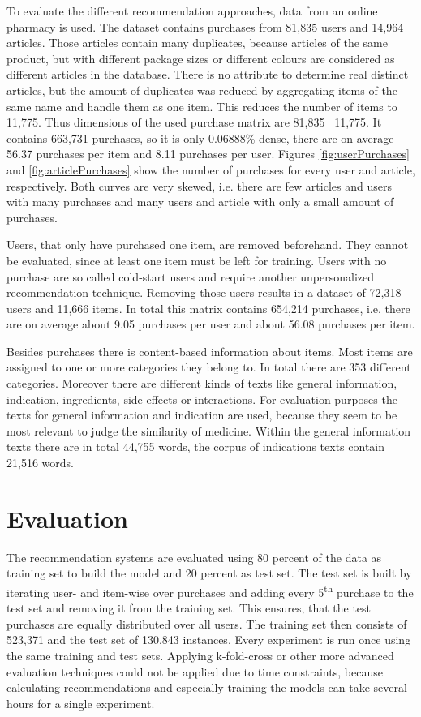 \documentclass[10pt]{reportMaster}
\begin{document}
To evaluate the different recommendation approaches, data from an online pharmacy is used.
The dataset contains purchases from 81,835 users and 14,964 articles.
Those articles contain many duplicates, because articles of the same product, but with different package sizes or different colours are considered as different articles in the database.
There is no attribute to determine real distinct articles, but the amount of duplicates was reduced by aggregating items of the same name and handle them as one item.
This reduces the number of items to 11,775.
Thus dimensions of the used purchase matrix are 81,835 \texttimes \ 11,775.
It contains 663,731 purchases, so it is only 0.06888\% dense, there are on average 56.37 purchases per item and 8.11 purchases per user. %
Figures \ref{fig:userPurchases} and \ref{fig:articlePurchases} show the number of purchases for every user and article, respectively.
Both curves are very skewed, i.e. there are few articles and users with many purchases and many users and article with only a small amount of purchases.

Users, that only have purchased one item, are removed beforehand.
They cannot be evaluated, since at least one item must be left for training.
Users with no purchase are so called cold-start users and require another unpersonalized recommendation technique.
Removing those users results in a dataset of 72,318 users and 11,666 items.
In total this matrix contains 654,214 purchases, i.e. there are on average about 9.05 purchases per user and about 56.08 purchases per item.

Besides purchases there is content-based information about items.
Most items are assigned to one or more categories they belong to.
In total there are 353 different categories.
Moreover there are different kinds of texts like general information, indication, ingredients, side effects or interactions.
For evaluation purposes the texts for general information and indication are used, because they seem to be most relevant to judge the similarity of medicine.
Within the general information texts there are in total 44,755 words, the corpus of indications texts contain 21,516 words.


 \section{Evaluation}
\label{sec:eval}
The recommendation systems are evaluated using 80 percent of the data as training set to build the model and 20 percent as test set.
The test set is built by iterating user- and item-wise over purchases and adding every 5\textsuperscript{th} purchase to the test set and removing it from the training set.
This ensures, that the test purchases are equally distributed over all users.
The training set then consists of 523,371 and the test set of 130,843 instances.
Every experiment is run once using the same training and test sets.
Applying k-fold-cross or other more advanced evaluation techniques could not be applied due to time constraints, because calculating recommendations and especially training the models can take several hours for a single experiment.
\end{document}
